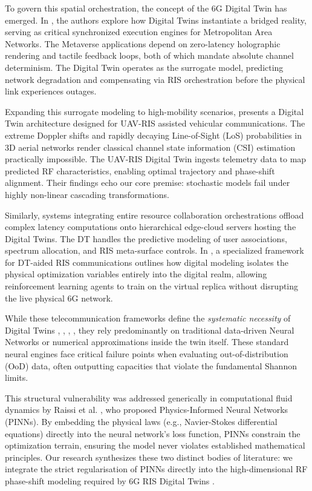 \documentclass[conference]{IEEEtran}
\begin{document}
To govern this spatial orchestration, the concept of the 6G Digital Twin has emerged. In \cite{metaverse2021}, the authors explore how Digital Twins instantiate a bridged reality, serving as critical synchronized execution engines for Metropolitan Area Networks. The Metaverse applications depend on zero-latency holographic rendering and tactile feedback loops, both of which mandate absolute channel determinism. The Digital Twin operates as the surrogate model, predicting network degradation and compensating via RIS orchestration before the physical link experiences outages.

Expanding this surrogate modeling to high-mobility scenarios, \cite{uav2022} presents a Digital Twin architecture designed for UAV-RIS assisted vehicular communications. The extreme Doppler shifts and rapidly decaying Line-of-Sight (LoS) probabilities in 3D aerial networks render classical channel state information (CSI) estimation practically impossible. The UAV-RIS Digital Twin ingests telemetry data to map predicted RF characteristics, enabling optimal trajectory and phase-shift alignment. Their findings echo our core premise: stochastic models fail under highly non-linear cascading transformations.

Similarly, systems integrating entire resource collaboration orchestrations \cite{integrated2023} offload complex latency computations onto hierarchical edge-cloud servers hosting the Digital Twins. The DT handles the predictive modeling of user associations, spectrum allocation, and RIS meta-surface controls. In \cite{dt_aided2022}, a specialized framework for DT-aided RIS communications outlines how digital modeling isolates the physical optimization variables entirely into the digital realm, allowing reinforcement learning agents to train on the virtual replica without disrupting the live physical 6G network.

While these telecommunication frameworks define the \textit{systematic necessity} of Digital Twins \cite{metaverse2021}, \cite{uav2022}, \cite{dt_aided2022}, \cite{integrated2023}, they rely predominantly on traditional data-driven Neural Networks or numerical approximations inside the twin itself. These standard neural engines face critical failure points when evaluating out-of-distribution (OoD) data, often outputting capacities that violate the fundamental Shannon limits.

This structural vulnerability was addressed generically in computational fluid dynamics by Raissi et al. \cite{raissi2019}, who proposed Physics-Informed Neural Networks (PINNs). By embedding the physical laws (e.g., Navier-Stokes differential equations) directly into the neural network's loss function, PINNs constrain the optimization terrain, ensuring the model never violates established mathematical principles. Our research synthesizes these two distinct bodies of literature: we integrate the strict regularisation of PINNs \cite{raissi2019} directly into the high-dimensional RF phase-shift modeling required by 6G RIS Digital Twins \cite{basar2019}.
\end{document}
